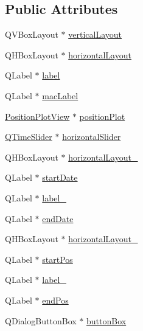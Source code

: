 \subsection*{Public Attributes}
\begin{DoxyCompactItemize}
\item 
Q\+V\+Box\+Layout $\ast$ \hyperlink{class_ui___position_dialog_a71ea0f4d2fc6f6ab2ebf962f790dfe28}{vertical\+Layout}
\item 
Q\+H\+Box\+Layout $\ast$ \hyperlink{class_ui___position_dialog_a854085c2dd2fe77dcbd2b37646ab1caa}{horizontal\+Layout}
\item 
Q\+Label $\ast$ \hyperlink{class_ui___position_dialog_acfd9f5b7e11ed001eae42f51cb4547e8}{label}
\item 
Q\+Label $\ast$ \hyperlink{class_ui___position_dialog_ac35eab25d41299521b8e397b5fac0c49}{mac\+Label}
\item 
\hyperlink{class_position_plot_view}{Position\+Plot\+View} $\ast$ \hyperlink{class_ui___position_dialog_a5fb37405c4ce9a11bf177edde1a2f27e}{position\+Plot}
\item 
\hyperlink{class_q_time_slider}{Q\+Time\+Slider} $\ast$ \hyperlink{class_ui___position_dialog_a528aa7c4ccd8f8fcbcaba7a9a45ea772}{horizontal\+Slider}
\item 
Q\+H\+Box\+Layout $\ast$ \hyperlink{class_ui___position_dialog_a3a4b908f7e48469b978e2b498418d565}{horizontal\+Layout\+\_}
\item 
Q\+Label $\ast$ \hyperlink{class_ui___position_dialog_a999aee840eed722bf44d114795125dd5}{start\+Date}
\item 
Q\+Label $\ast$ \hyperlink{class_ui___position_dialog_a3fe2c2f8869d14ccac585d1fad30cde0}{label\+\_}
\item 
Q\+Label $\ast$ \hyperlink{class_ui___position_dialog_a8db41be7faa889fa9347abac4570547d}{end\+Date}
\item 
Q\+H\+Box\+Layout $\ast$ \hyperlink{class_ui___position_dialog_a37314ff37d2cea357e19769039713007}{horizontal\+Layout\+\_}
\item 
Q\+Label $\ast$ \hyperlink{class_ui___position_dialog_af87caa4a33b98ff46484b96d1edbabed}{start\+Pos}
\item 
Q\+Label $\ast$ \hyperlink{class_ui___position_dialog_abfdb49e7bb24c9b1e6db6e7f1c1ebc04}{label\+\_}
\item 
Q\+Label $\ast$ \hyperlink{class_ui___position_dialog_a0a145b2d27ed49b779c80f70138f4f51}{end\+Pos}
\item 
Q\+Dialog\+Button\+Box $\ast$ \hyperlink{class_ui___position_dialog_adabcb27fd3e4126a2251c0068e627e5d}{button\+Box}
\end{DoxyCompactItemize}


